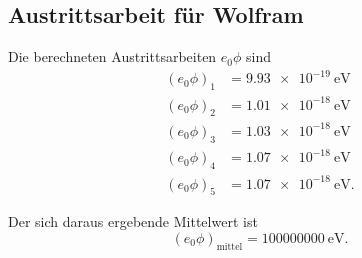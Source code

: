 \subsection{Austrittsarbeit für Wolfram}
Die berechneten Austrittsarbeiten $e_0 \phi$ sind
\begin{align*}
    (e_0 \phi)_\text{1} &= \SI{9.93e-19}{\electronvolt} \\
    (e_0 \phi)_\text{2} &= \SI{1.01e-18}{\electronvolt} \\
    (e_0 \phi)_\text{3} &= \SI{1.03e-18}{\electronvolt} \\
    (e_0 \phi)_\text{4} &= \SI{1.07e-18}{\electronvolt} \\
    (e_0 \phi)_\text{5} &= \SI{1.07e-18}{\electronvolt}.
\end{align*}

\noindent Der sich daraus ergebende Mittelwert ist
\begin{equation*}
    (e_0 \phi)_\text{mittel} = \SI{100000000}{\electronvolt}.
\end{equation*}